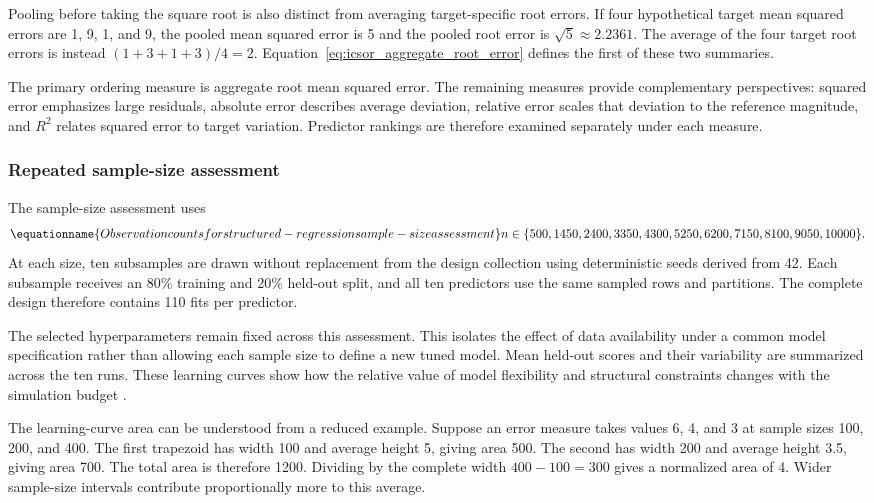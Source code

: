 Pooling before taking the square root is also distinct from averaging target-specific root errors. If four hypothetical target mean squared errors are 1, 9, 1, and 9, the pooled mean squared error is 5 and the pooled root error is \(\sqrt5\approx2.2361\). The average of the four target root errors is instead \((1+3+1+3)/4=2\). Equation~\eqref{eq:icsor_aggregate_root_error} defines the first of these two summaries.

The primary ordering measure is aggregate root mean squared error. The remaining measures provide complementary perspectives: squared error emphasizes large residuals, absolute error describes average deviation, relative error scales that deviation to the reference magnitude, and \(R^2\) relates squared error to target variation. Predictor rankings are therefore examined separately under each measure.

\subsubsection{Repeated sample-size assessment}

The sample-size assessment uses
\begin{equation}
\equationname{Observation counts for structured-regression sample-size assessment}
\label{eq:icsor_assessment_sizes}
n\in\{500,1450,2400,3350,4300,5250,6200,7150,8100,9050,10000\}.
\end{equation}
At each size, ten subsamples are drawn without replacement from the design collection using deterministic seeds derived from 42. Each subsample receives an 80\% training and 20\% held-out split, and all ten predictors use the same sampled rows and partitions. The complete design therefore contains 110 fits per predictor.

The selected hyperparameters remain fixed across this assessment. This isolates the effect of data availability under a common model specification rather than allowing each sample size to define a new tuned model. Mean held-out scores and their variability are summarized across the ten runs. These learning curves show how the relative value of model flexibility and structural constraints changes with the simulation budget \citep{Geman1992,VieringLoog2023}.

The learning-curve area can be understood from a reduced example. Suppose an error measure takes values 6, 4, and 3 at sample sizes 100, 200, and 400. The first trapezoid has width 100 and average height 5, giving area 500. The second has width 200 and average height 3.5, giving area 700. The total area is therefore 1200. Dividing by the complete width \(400-100=300\) gives a normalized area of 4. Wider sample-size intervals contribute proportionally more to this average.


